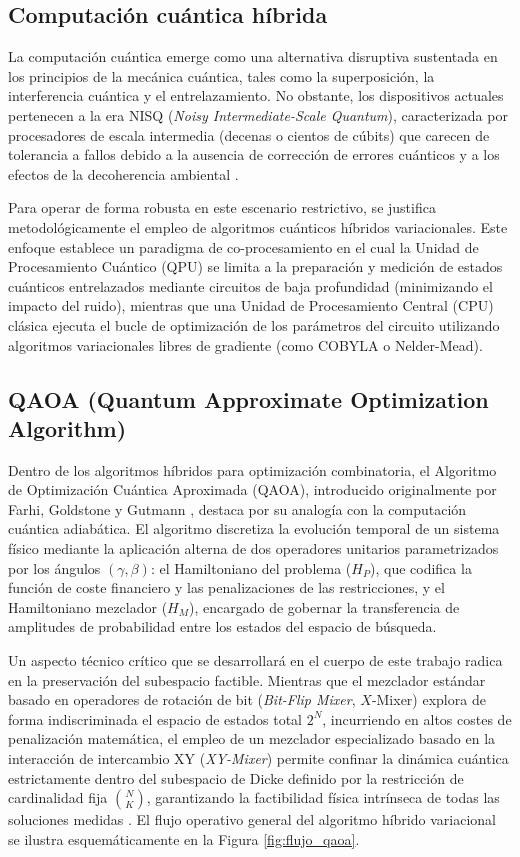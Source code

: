 \subsection{Computación cuántica híbrida}
La computación cuántica emerge como una alternativa disruptiva sustentada en los principios de la mecánica cuántica, tales como la superposición, la interferencia cuántica y el entrelazamiento. No obstante, los dispositivos actuales pertenecen a la era NISQ (\textit{Noisy Intermediate-Scale Quantum}), caracterizada por procesadores de escala intermedia (decenas o cientos de cúbits) que carecen de tolerancia a fallos debido a la ausencia de corrección de errores cuánticos y a los efectos de la decoherencia ambiental \cite{Preskill2018}.

Para operar de forma robusta en este escenario restrictivo, se justifica metodológicamente el empleo de algoritmos cuánticos híbridos variacionales. Este enfoque establece un paradigma de co-procesamiento en el cual la Unidad de Procesamiento Cuántico (QPU) se limita a la preparación y medición de estados cuánticos entrelazados mediante circuitos de baja profundidad (minimizando el impacto del ruido), mientras que una Unidad de Procesamiento Central (CPU) clásica ejecuta el bucle de optimización de los parámetros del circuito utilizando algoritmos variacionales libres de gradiente (como COBYLA o Nelder-Mead).

\subsection{QAOA (Quantum Approximate Optimization Algorithm)}
Dentro de los algoritmos híbridos para optimización combinatoria, el Algoritmo de Optimización Cuántica Aproximada (QAOA), introducido originalmente por Farhi, Goldstone y Gutmann \cite{Farhi2014}, destaca por su analogía con la computación cuántica adiabática. El algoritmo discretiza la evolución temporal de un sistema físico mediante la aplicación alterna de dos operadores unitarios parametrizados por los ángulos $(\gamma, \beta)$: el Hamiltoniano del problema ($H_P$), que codifica la función de coste financiero y las penalizaciones de las restricciones, y el Hamiltoniano mezclador ($H_M$), encargado de gobernar la transferencia de amplitudes de probabilidad entre los estados del espacio de búsqueda. 

Un aspecto técnico crítico que se desarrollará en el cuerpo de este trabajo radica en la preservación del subespacio factible. Mientras que el mezclador estándar basado en operadores de rotación de bit (\textit{Bit-Flip Mixer}, $X$-Mixer) explora de forma indiscriminada el espacio de estados total $2^N$, incurriendo en altos costes de penalización matemática, el empleo de un mezclador especializado basado en la interacción de intercambio XY (\textit{XY-Mixer}) permite confinar la dinámica cuántica estrictamente dentro del subespacio de Dicke definido por la restricción de cardinalidad fija $\binom{N}{K}$, garantizando la factibilidad física intrínseca de todas las soluciones medidas \cite{Etxaaniiz2026}. El flujo operativo general del algoritmo híbrido variacional se ilustra esquemáticamente en la Figura \ref{fig:flujo_qaoa}.


